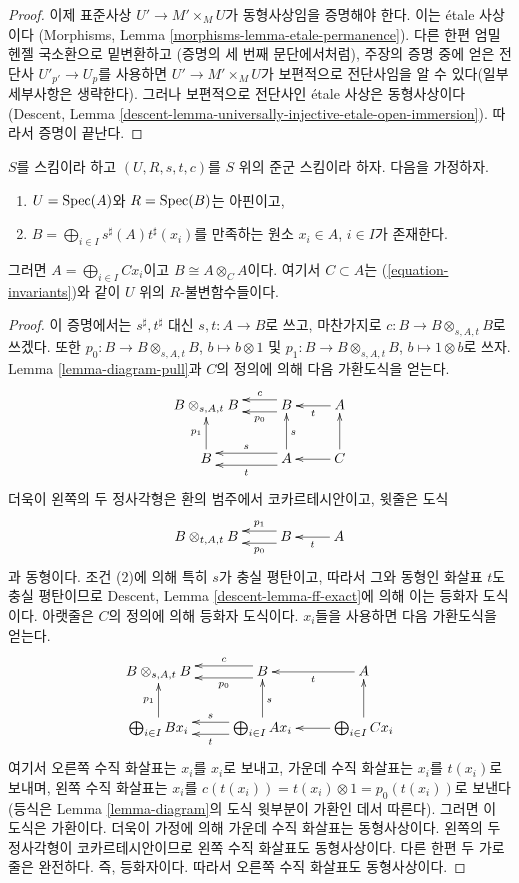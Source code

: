\begin{proof}
\medskip\noindent
이제 표준사상 $U' \to M' \times_M U$가 동형사상임을 증명해야 한다. 이는 \'etale 사상이다
(Morphisms, Lemma \ref{morphisms-lemma-etale-permanence}). 다른 한편 엄밀 헨젤 국소환으로 밑변환하고
(증명의 세 번째 문단에서처럼), 주장의 증명 중에 얻은 전단사 $U'_{p'} \to U_p$를 사용하면
$U' \to M' \times_M U$가 보편적으로 전단사임을 알 수 있다(일부 세부사항은 생략한다). 그러나 보편적으로 전단사인
\'etale 사상은 동형사상이다(Descent, Lemma \ref{descent-lemma-universally-injective-etale-open-immersion}).
따라서 증명이 끝난다.
\end{proof}

\begin{lemma}
\label{lemma-basis}
$S$를 스킴이라 하고 $(U, R, s, t, c)$를 $S$ 위의 준군 스킴이라 하자. 다음을 가정하자.
\begin{enumerate}
\item $U = \mathop{\mathrm{Spec}}(A)$와 $R = \mathop{\mathrm{Spec}}(B)$는 아핀이고,
\item $B = \bigoplus_{i \in I} s^\sharp(A)t^\sharp(x_i)$를 만족하는 원소 $x_i \in A$, $i \in I$가 존재한다.
\end{enumerate}
그러면 $A = \bigoplus_{i\in I} Cx_i$이고 $B \cong A \otimes_C A$이다. 여기서 $C \subset A$는
(\ref{equation-invariants})와 같이 $U$ 위의 $R$-불변함수들이다.
\end{lemma}

\begin{proof}
이 증명에서는 $s^\sharp, t^\sharp$ 대신 $s, t : A \to B$로 쓰고, 마찬가지로
$c : B \to B \otimes_{s, A, t} B$로 쓰겠다. 또한
$p_0 : B \to B \otimes_{s, A, t} B$, $b \mapsto b \otimes 1$ 및
$p_1 : B \to B \otimes_{s, A, t} B$, $b \mapsto 1 \otimes b$로 쓰자.
Lemma \ref{lemma-diagram-pull}과 $C$의 정의에 의해 다음 가환도식을 얻는다.
$$
\xymatrix{
B \otimes_{s, A, t} B &
B \ar@<-1ex>[l]_-c \ar@<1ex>[l]^-{p_0} &
A \ar[l]^t \\
B \ar[u]^{p_1} &
A \ar@<-1ex>[l]_s \ar@<1ex>[l]^t \ar[u]_s &
C \ar[u] \ar[l]
}
$$
더욱이 왼쪽의 두 정사각형은 환의 범주에서 코카르테시안이고, 윗줄은 도식
$$
\xymatrix{
B \otimes_{t, A, t} B &
B \ar@<-1ex>[l]_-{p_1} \ar@<1ex>[l]^-{p_0} &
A \ar[l]^t
}
$$
과 동형이다. 조건 (2)에 의해 특히 $s$가 충실 평탄이고, 따라서 그와 동형인 화살표 $t$도 충실 평탄이므로
Descent, Lemma \ref{descent-lemma-ff-exact}에 의해 이는 등화자 도식이다.
아랫줄은 $C$의 정의에 의해 등화자 도식이다. $x_i$들을 사용하면 다음 가환도식을 얻는다.
$$
\xymatrix{
B \otimes_{s, A, t} B &
B \ar@<-1ex>[l]_-c \ar@<1ex>[l]^-{p_0} &
A \ar[l]^t \\
\bigoplus_{i \in I} B x_i \ar[u]^{p_1} &
\bigoplus_{i \in I} A x_i \ar@<-1ex>[l]_s \ar@<1ex>[l]^t \ar[u]_s &
\bigoplus_{i \in I} C x_i \ar[u] \ar[l]
}
$$
여기서 오른쪽 수직 화살표는 $x_i$를 $x_i$로 보내고, 가운데 수직 화살표는 $x_i$를 $t(x_i)$로 보내며,
왼쪽 수직 화살표는 $x_i$를 $c(t(x_i)) = t(x_i) \otimes 1 = p_0(t(x_i))$로 보낸다
(등식은 Lemma \ref{lemma-diagram}의 도식 윗부분이 가환인 데서 따른다). 그러면 이 도식은 가환이다.
더욱이 가정에 의해 가운데 수직 화살표는 동형사상이다. 왼쪽의 두 정사각형이 코카르테시안이므로
왼쪽 수직 화살표도 동형사상이다. 다른 한편 두 가로줄은 완전하다. 즉, 등화자이다.
따라서 오른쪽 수직 화살표도 동형사상이다.
\end{proof}

